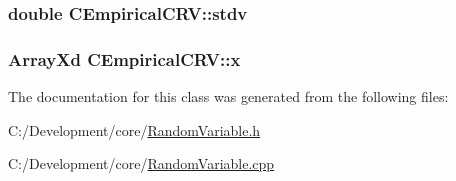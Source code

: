 \hypertarget{class_c_empirical_c_r_v_aefa632e54ddee3239c56c55a0cbf748e}{
\subsubsection[{stdv}]{\setlength{\rightskip}{0pt plus 5cm}double C\-Empirical\-C\-R\-V\-::stdv\hspace{0.3cm}{\ttfamily [private]}}}\label{class_c_empirical_c_r_v_aefa632e54ddee3239c56c55a0cbf748e}
\hypertarget{class_c_empirical_c_r_v_a9fa34c36e5695450ab958078517882ed}{
\subsubsection[{x}]{\setlength{\rightskip}{0pt plus 5cm}Array\-Xd C\-Empirical\-C\-R\-V\-::x\hspace{0.3cm}{\ttfamily [private]}}}\label{class_c_empirical_c_r_v_a9fa34c36e5695450ab958078517882ed}


The documentation for this class was generated from the following files\-:\begin{DoxyCompactItemize}
\item 
C\-:/\-Development/core/\hyperlink{_random_variable_8h}{Random\-Variable.\-h}\item 
C\-:/\-Development/core/\hyperlink{_random_variable_8cpp}{Random\-Variable.\-cpp}\end{DoxyCompactItemize}
